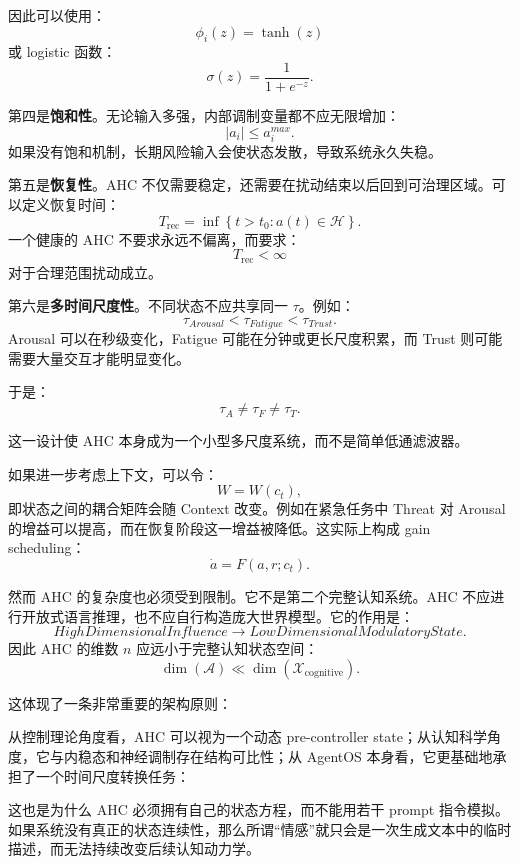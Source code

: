 因此可以使用：
\[
\phi_i(z)
=
\tanh(z)
\]
或 logistic 函数：
\[
\sigma(z)=\frac{1}{1+e^{-z}}.
\]

第四是\textbf{饱和性}。无论输入多强，内部调制变量都不应无限增加：
\[
|a_i|\leq a_i^{max}.
\]
如果没有饱和机制，长期风险输入会使状态发散，导致系统永久失稳。

第五是\textbf{恢复性}。AHC 不仅需要稳定，还需要在扰动结束以后回到可治理区域。可以定义恢复时间：
\[
T_{\mathrm{rec}}
=
\inf
\left\{
t>t_0:
a(t)\in\mathcal H
\right\}.
\]
一个健康的 AHC 不要求永远不偏离，而要求：
\[
T_{\mathrm{rec}}<\infty
\]
对于合理范围扰动成立。

第六是\textbf{多时间尺度性}。不同状态不应共享同一 \(\tau\)。例如：
\[
\tau_{Arousal}
<
\tau_{Fatigue}
<
\tau_{Trust}.
\]
Arousal 可以在秒级变化，Fatigue 可能在分钟或更长尺度积累，而 Trust 则可能需要大量交互才能明显变化。

于是：
\[
\boxed{
\tau_A\neq\tau_F\neq\tau_T.
}
\]

这一设计使 AHC 本身成为一个小型多尺度系统，而不是简单低通滤波器。

如果进一步考虑上下文，可以令：
\[
W=W(c_t),
\]
即状态之间的耦合矩阵会随 Context 改变。例如在紧急任务中 Threat 对 Arousal 的增益可以提高，而在恢复阶段这一增益被降低。这实际上构成 gain scheduling：
\[
\dot a
=
F(a,r;c_t).
\]

然而 AHC 的复杂度也必须受到限制。它不是第二个完整认知系统。AHC 不应进行开放式语言推理，也不应自行构造庞大世界模型。它的作用是：
\[
HighDimensionalInfluence
\rightarrow
LowDimensionalModulatoryState.
\]
因此 AHC 的维数 \(n\) 应远小于完整认知状态空间：
\[
\dim(\mathcal A)
\ll
\dim(\mathcal X_{\mathrm{cognitive}}).
\]

这体现了一条非常重要的架构原则：
\begin{statementbox}
\centering
{}
\end{statementbox}

从控制理论角度看，AHC 可以视为一个动态 pre-controller state；从认知科学角度，它与内稳态和神经调制存在结构可比性；从 AgentOS 本身看，它更基础地承担了一个时间尺度转换任务：
\begin{statementbox}
\centering
{}
\end{statementbox}

这也是为什么 AHC 必须拥有自己的状态方程，而不能用若干 prompt 指令模拟。如果系统没有真正的状态连续性，那么所谓“情感”就只会是一次生成文本中的临时描述，而无法持续改变后续认知动力学。

